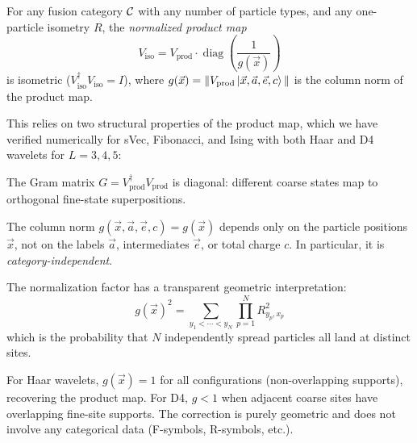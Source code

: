 \begin{theorem}
\label{thm:normalized-product}
For any fusion category $\mathcal{C}$ with any number of particle types, and any one-particle isometry $R$, the \emph{normalized product map}
\begin{equation}
\label{eq:normalized-product}
    V_{\mathrm{iso}} = V_{\mathrm{prod}} \cdot \operatorname{diag}\!\left(\frac{1}{g(\vec{x})}\right)
\end{equation}
is isometric ($V_{\mathrm{iso}}^\dagger V_{\mathrm{iso}} = I$), where $g(\vec{x}) = \|V_{\mathrm{prod}}\ket{\vec{x}, \vec{a}, \vec{e}, c}\|$ is the column norm of the product map.
\end{theorem}

This relies on two structural properties of the product map, which we have verified numerically for sVec, Fibonacci, and Ising with both Haar and D4 wavelets for $L = 3, 4, 5$:

\begin{claim}
\label{claim:diagonal-G}
The Gram matrix $G = V_{\mathrm{prod}}^\dagger V_{\mathrm{prod}}$ is diagonal: different coarse states map to orthogonal fine-state superpositions.
\end{claim}

\begin{claim}
\label{claim:position-norm}
The column norm $g(\vec{x}, \vec{a}, \vec{e}, c) = g(\vec{x})$ depends only on the particle positions $\vec{x}$, not on the labels $\vec{a}$, intermediates $\vec{e}$, or total charge $c$. In particular, it is \emph{category-independent}.
\end{claim}

The normalization factor has a transparent geometric interpretation:
\begin{equation}
    g(\vec{x})^2 = \sum_{y_1 < \cdots < y_N} \prod_{p=1}^N R_{y_p, x_p}^2
\end{equation}
which is the probability that $N$ independently spread particles all land at distinct sites.

\begin{remark}
For Haar wavelets, $g(\vec{x}) = 1$ for all configurations (non-overlapping supports), recovering the product map. For D4, $g < 1$ when adjacent coarse sites have overlapping fine-site supports. The correction is purely geometric and does not involve any categorical data (F-symbols, R-symbols, etc.).
\end{remark}

